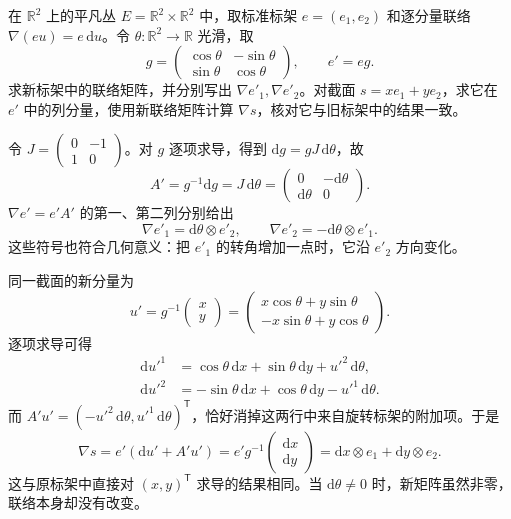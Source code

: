 \begin{exercise}\label{g1:ex:rotating-frame-connection}
	在 \(\mathbb R^2\) 上的平凡丛 \(E=\mathbb R^2\times\mathbb R^2\) 中，取标准标架 \(e=(e_1,e_2)\) 和逐分量联络 \(\nabla(eu)=e\,\mathrm{d}u\)。令 \(\theta:\mathbb R^2\to\mathbb R\) 光滑，取
	\[
		g=\begin{pmatrix}\cos\theta&-\sin\theta\\\sin\theta&\cos\theta\end{pmatrix},\qquad e'=eg.
	\]
	求新标架中的联络矩阵，并分别写出 \(\nabla e'_1,\nabla e'_2\)。对截面 \(s=xe_1+ye_2\)，求它在 \(e'\) 中的列分量，使用新联络矩阵计算 \(\nabla s\)，核对它与旧标架中的结果一致。
\end{exercise}
\begin{solution}
	令 \(J=\begin{pmatrix}0&-1\\1&0\end{pmatrix}\)。对 \(g\) 逐项求导，得到 \(\mathrm{d}g=gJ\,\mathrm{d}\theta\)，故
	\[
		A'=g^{-1}\mathrm{d}g=J\,\mathrm{d}\theta
		=\begin{pmatrix}0&-\mathrm{d}\theta\\\mathrm{d}\theta&0\end{pmatrix}.
	\]
	\(\nabla e'=e'A'\) 的第一、第二列分别给出
	\[
		\nabla e'_1=\mathrm{d}\theta\otimes e'_2,\qquad
		\nabla e'_2=-\mathrm{d}\theta\otimes e'_1.
	\]
	这些符号也符合几何意义：把 \(e'_1\) 的转角增加一点时，它沿 \(e'_2\) 方向变化。

	同一截面的新分量为
	\[
		u'=g^{-1}\begin{pmatrix}x\\y\end{pmatrix}
		=\begin{pmatrix}x\cos\theta+y\sin\theta\\-x\sin\theta+y\cos\theta\end{pmatrix}.
	\]
	逐项求导可得
	\begin{align*}
		\mathrm{d}u'^1&=\cos\theta\,\mathrm{d}x+\sin\theta\,\mathrm{d}y+u'^2\,\mathrm{d}\theta,\\
		\mathrm{d}u'^2&=-\sin\theta\,\mathrm{d}x+\cos\theta\,\mathrm{d}y-u'^1\,\mathrm{d}\theta.
	\end{align*}
	而 \(A'u'=(-u'^2\,\mathrm{d}\theta,u'^1\,\mathrm{d}\theta)^{\mathsf T}\)，恰好消掉这两行中来自旋转标架的附加项。于是
	\[
		\nabla s=e'(\mathrm{d}u'+A'u')
		=e'g^{-1}\begin{pmatrix}\mathrm{d}x\\\mathrm{d}y\end{pmatrix}
		=\mathrm{d}x\otimes e_1+\mathrm{d}y\otimes e_2.
	\]
	这与原标架中直接对 \((x,y)^{\mathsf T}\) 求导的结果相同。当 \(\mathrm{d}\theta\ne0\) 时，新矩阵虽然非零，联络本身却没有改变。
\end{solution}


